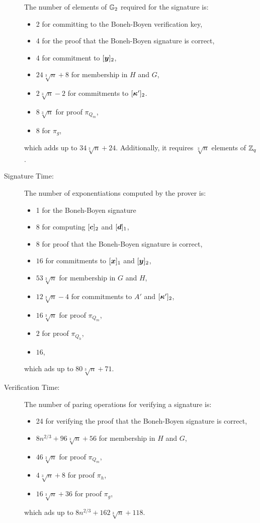 \begin{description}
The number of elements of $\mathbb{G}_2$ required  for the signature is:
\begin{itemize}
\item 2 for committing to the Boneh-Boyen verification key,
\item 4 for the proof that the Boneh-Boyen signature is correct,
\item 4 for commitment to $[{\boldsymbol{y}}]_2$,
\item $24\sqrt[3]{n} + 8$ for membership in $H$ and $G$,
\item $2\sqrt[3]{n}-2$ for commitments to $[{\boldsymbol{\kappa}}']_2$.
\item $8\sqrt[3]{n}$ for proof  $\pi_{Q_m}$,
\item $8$ for $\pi_g$,
\end{itemize}
which adds up to $34\sqrt[3]{n} + 24$. Additionally, it requires $\sqrt[3]{n}$ elements of $\mathbb{Z}_q$.
\item[Signature Time:] The number of exponentiations computed by the prover is:
\begin{itemize}
\item 1 for the Boneh-Boyen signature
\item 8 for computing $[{\boldsymbol{c}}]_2$ and $[{\boldsymbol{d}}]_1$,
\item 8 for proof that the Boneh-Boyen signature is correct,
\item $16$ for commitments to $[{\boldsymbol{x}}]_1$ and $[{\boldsymbol{y}}]_2$,
\item $53\sqrt[3]{n}$ for membership in $G$ and $H$,
\item $12\sqrt[3]{n}-4$ for commitments to $A'$ and $[{\boldsymbol{\kappa}}']_2$,
\item $16\sqrt[3]{n}$ for proof $\pi_{Q_m}$,
\item $2$ for proof $\pi_{Q_h}$,
\item $16$,
\end{itemize}
which ads up to $80\sqrt[3]{n}+71$.
\item[Verification Time:] The number of paring operations for verifying a signature is:
\begin{itemize}
\item 24 for verifying the proof that the Boneh-Boyen signature is correct,
\item $8n^{2/3} + 96\sqrt[3]{n} + 56$ for membership in $H$ and $G$,
\item $46\sqrt[3]{n}$ for proof $\pi_{Q_m}$,
\item $4\sqrt[3]{n}+8$ for proof $\pi_h$,
\item $16\sqrt[3]{n}+36$ for proof $\pi_g$,
\end{itemize}
which ads up to $8n^{2/3} + 162\sqrt[3]{n} + 118$.
\end{description}